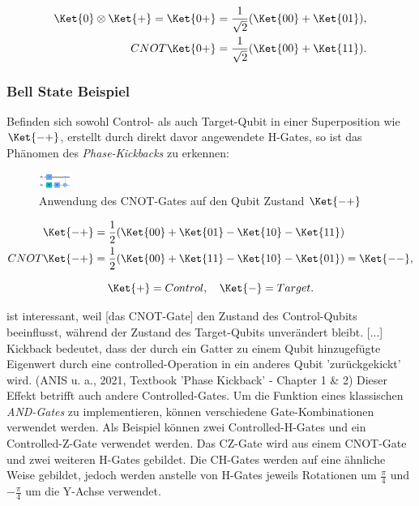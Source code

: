 \begin{align*}
    \Ket{0} \otimes \Ket{+} = \Ket{0+} = \frac{1}{\sqrt{2}} (\Ket{00} + \Ket{01}), \\
    CNOT\Ket{0+} = \frac{1}{\sqrt{2}} (\Ket{00} + \Ket{11}).
\end{align*}

\subsubsection{Bell State Beispiel}
\newline

Befinden sich sowohl Control- als auch Target-Qubit in einer Superposition wie \(\Ket{-+}\), erstellt durch direkt davor angewendete H-Gates, so ist das Phänomen des \textit{Phase-Kickbacks} zu erkennen:

\begin{figure}
    \centering
    \includegraphics[width=40]{content/CNOT_HXH.JPG}
    \caption{Anwendung des CNOT-Gates auf den Qubit Zustand \(\Ket{-+}\)}

\end{figure}

\begin{align*}
    \Ket{-+}     & = \frac{1}{2}(\Ket{00} + \Ket{01} - \Ket{10} - \Ket{11})            \\
    CNOT\Ket{-+} & = \frac{1}{2}(\Ket{00} + \Ket{11} - \Ket{10} -\Ket{01}) = \Ket{--},
\end{align*}

\[\Ket{+} = Control, \quad \Ket{-} = Target.\]

\glqqDas ist interessant, weil [das CNOT-Gate] den Zustand des Control-Qubits beeinflusst, während der Zustand des Target-Qubits unverändert bleibt. [...] Kickback bedeutet, dass der durch ein Gatter zu einem Qubit hinzugefügte Eigenwert durch eine controlled-Operation in ein anderes Qubit 'zurückgekickt' wird. \grqq (ANIS u. a., 2021, Textbook ’Phase Kickback’ - Chapter 1 & 2) Dieser Effekt betrifft auch andere Controlled-Gates. \newline
\newline
Um die Funktion eines klassischen \textit{AND-Gates} zu implementieren, können verschiedene Gate-Kombinationen verwendet werden. Als Beispiel können zwei Controlled-H-Gates und ein Controlled-Z-Gate verwendet werden. Das CZ-Gate wird aus einem CNOT-Gate und zwei weiteren H-Gates gebildet. Die CH-Gates werden auf eine ähnliche Weise gebildet, jedoch werden anstelle von H-Gates jeweils Rotationen um \(\frac{\pi}{4}\) und \(-\frac{\pi}{4}\) um die Y-Achse verwendet.


